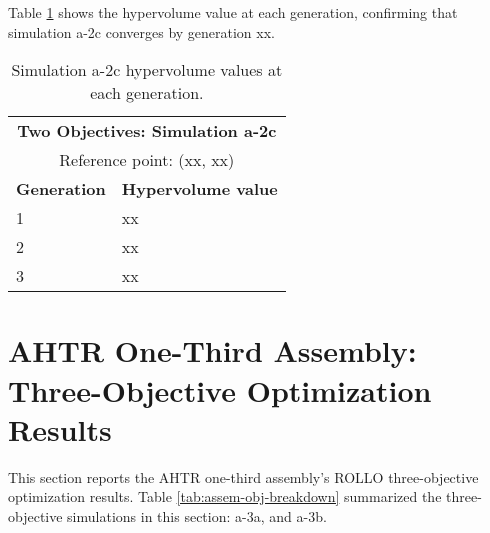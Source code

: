 Table \ref{tab:a2c-hypervolume} shows the hypervolume value at each generation, 
confirming that simulation a-2c converges by generation xx. 
\begin{table}[htbp!]
    \centering
    \onehalfspacing
    \caption{Simulation a-2c hypervolume values at each generation.}
	\label{tab:a2c-hypervolume}
    \footnotesize
    \begin{tabular}{ll}
    \hline 
    \multicolumn{2}{c}{\textbf{Two Objectives: Simulation a-2c}} \\
    \multicolumn{2}{c}{Reference point: (xx, xx)} \\
    \hline 
    \textbf{Generation} & \textbf{Hypervolume value} \\
    \hline
    1 & xx \\
    2 & xx \\
    3 & xx \\
    \hline
    \end{tabular}
\end{table}

\pagebreak
\section{AHTR One-Third Assembly: Three-Objective Optimization Results}
\label{assem-three-obj}
This section reports the \gls{AHTR} one-third assembly's \gls{ROLLO} three-objective 
optimization results. 
Table \ref{tab:assem-obj-breakdown} summarized the three-objective simulations in this 
section: a-3a, and a-3b. 

